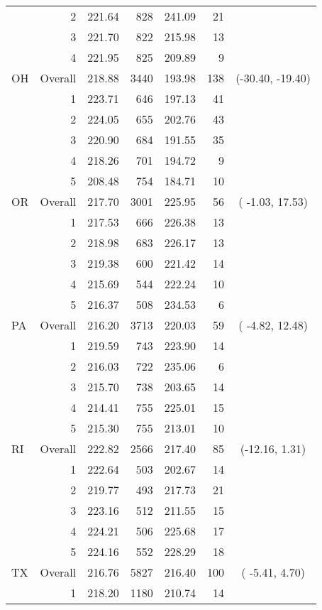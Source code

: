 \begin{longtable}{lrrr@{\extracolsep{.25cm}}rrc}
   & 2 & 221.64 & 828 & 241.09 &  21 &  \\ 
   & 3 & 221.70 & 822 & 215.98 &  13 &  \\ 
   & 4 & 221.95 & 825 & 209.89 &   9 &  \\ 
   \hline
OH & Overall & 218.88 & 3440 & 193.98 & 138 & (-30.40, -19.40) \\ 
   & 1 & 223.71 & 646 & 197.13 &  41 &  \\ 
   & 2 & 224.05 & 655 & 202.76 &  43 &  \\ 
   & 3 & 220.90 & 684 & 191.55 &  35 &  \\ 
   & 4 & 218.26 & 701 & 194.72 &   9 &  \\ 
   & 5 & 208.48 & 754 & 184.71 &  10 &  \\ 
   \hline
OR & Overall & 217.70 & 3001 & 225.95 &  56 & ( -1.03,  17.53) \\ 
   & 1 & 217.53 & 666 & 226.38 &  13 &  \\ 
   & 2 & 218.98 & 683 & 226.17 &  13 &  \\ 
   & 3 & 219.38 & 600 & 221.42 &  14 &  \\ 
   & 4 & 215.69 & 544 & 222.24 &  10 &  \\ 
   & 5 & 216.37 & 508 & 234.53 &   6 &  \\ 
   \hline
PA & Overall & 216.20 & 3713 & 220.03 &  59 & ( -4.82,  12.48) \\ 
   & 1 & 219.59 & 743 & 223.90 &  14 &  \\ 
   & 2 & 216.03 & 722 & 235.06 &   6 &  \\ 
   & 3 & 215.70 & 738 & 203.65 &  14 &  \\ 
   & 4 & 214.41 & 755 & 225.01 &  15 &  \\ 
   & 5 & 215.30 & 755 & 213.01 &  10 &  \\ 
   \hline
RI & Overall & 222.82 & 2566 & 217.40 &  85 & (-12.16,   1.31) \\ 
   & 1 & 222.64 & 503 & 202.67 &  14 &  \\ 
   & 2 & 219.77 & 493 & 217.73 &  21 &  \\ 
   & 3 & 223.16 & 512 & 211.55 &  15 &  \\ 
   & 4 & 224.21 & 506 & 225.68 &  17 &  \\ 
   & 5 & 224.16 & 552 & 228.29 &  18 &  \\ 
   \hline
TX & Overall & 216.76 & 5827 & 216.40 & 100 & ( -5.41,   4.70) \\ 
   & 1 & 218.20 & 1180 & 210.74 &  14 &  \\ 

\end{longtable}
